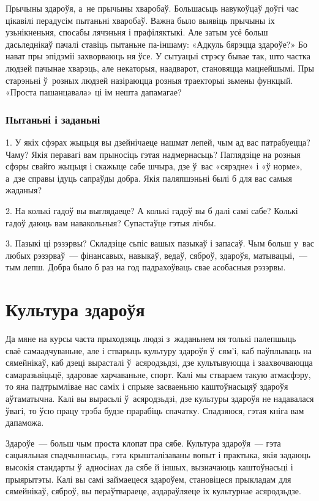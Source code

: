 Прычыны здароўя, а~не прычыны хваробаў. Большасьць навукоўцаў доўгі час цікавілі перадусім пытаньні хваробаў. Важна было выявіць прычыны іх узьнікненьня, спосабы лячэньня і прафіляктыкі. Але затым усё больш дасьледнікаў пачалі ставіць пытаньне па-іншаму: «Адкуль бярэцца здароўе?» Бо нават пры эпідэміі захворваюць ня ўсе. У сытуацыі стрэсу бывае так, што частка людзей пачынае хварэць, але некаторыя, наадварот, становяцца мацнейшымі. Пры старэньні ў~розных людзей назіраюцца розныя траекторыі зьмены функцый. «Проста пашанцавала» ці ім нешта дапамагае?

\subsubsection{Пытаньні і заданьні}

1. У якіх сфэрах жыцьця вы дзейнічаеце нашмат лепей, чым ад вас патрабуецца? Чаму? Якія перавагі вам прыносіць гэтая надмернасьць? Паглядзіце на розныя сфэры свайго жыцьця і скажыце сабе шчыра, дзе ў~вас «сярэдне» і «ў норме», а~дзе справы ідуць сапраўды добра. Якія паляпшэньні былі б для вас самыя жаданыя?

2. На колькі гадоў вы выглядаеце? А колькі гадоў вы б далі самі сабе? Колькі гадоў даюць вам навакольныя? Супастаўце гэтыя лічбы.

3. Пазыкі ці рэзэрвы? Складзіце сьпіс вашых пазыкаў і запасаў. Чым больш у~вас любых рэзэрваў~--- фінансавых, навыкаў, ведаў, сяброў, здароўя, матывацыі,~--- тым лепш. Добра было б раз на год падрахоўваць свае асобасныя рэзэрвы.


\section{Культура здароўя}

Да мяне на курсы часта прыходзяць людзі з~жаданьнем ня толькі палепшыць сваё самаадчуваньне, але і стварыць культуру здароўя ў~сям'і, каб паўплываць на сямейнікаў, каб дзеці вырасталі ў~асяродзьдзі, дзе культывуюцца і заахвочваюцца самаразьвіцьцё, здаровае харчаваньне, спорт. Калі мы ствараем такую атмасфэру, то яна падтрымлівае нас саміх і спрыяе засваеньню каштоўнасьцяў здароўя аўтаматычна. Калі вы вырасьлі ў~асяродзьдзі, дзе культуры здароўя не надавалася ўвагі, то ўсю працу трэба будзе прарабіць спачатку. Спадзяюся, гэтая кніга вам дапаможа.

Здароўе~--- больш чым проста клопат пра сябе. Культура здароўя~--- гэта сацыяльная спадчыннасьць, гэта крышталізаваны вопыт і практыка, якія задаюць высокія стандарты ў~адносінах да сябе й іншых, вызначаюць каштоўнасьці і прыярытэты. Калі вы самі займаецеся здароўем, становіцеся прыкладам для сямейнікаў, сяброў, вы пераўтвараеце, аздараўляеце іх культурнае асяродзьдзе.

